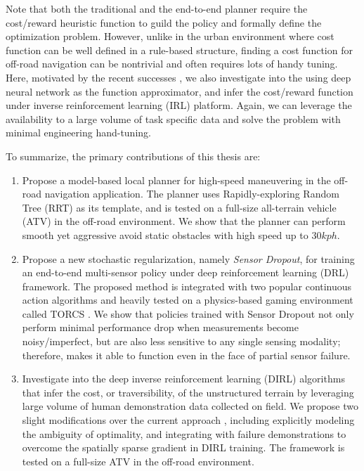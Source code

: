 \documentclass[../thesis.tex]{subfiles}
\begin{document}
Note that both the traditional and the end-to-end planner require the cost/reward heuristic function to guild the policy and formally define the optimization problem. 
However, unlike in the urban environment where cost function can be well defined in a rule-based structure, finding a cost function for off-road navigation can be nontrivial and often requires lots of handy tuning. \cite{silver2010learning}
Here, motivated by the recent successes \cite{wulfmeier2015maximum,wulfmeier2016watch}, we also investigate into the using deep neural network as the function approximator, and infer the cost/reward function under inverse reinforcement learning (IRL) platform. 
Again, we can leverage the availability to a large volume of task specific data and solve the problem with minimal engineering hand-tuning.
 
To summarize, the primary contributions of this thesis are:
\begin{enumerate}
 
    \item %
    Propose a model-based local planner for high-speed maneuvering in the off-road navigation application. 
    The planner uses Rapidly-exploring Random Tree (RRT) \cite{kuffner2000rrt} as its template, and is tested on a full-size all-terrain vehicle (ATV) in the off-road environment. 
    We show that the planner can perform smooth yet aggressive avoid static obstacles with high speed up to $30 kph$.
 
    \item %
    Propose a new stochastic regularization, namely \emph{Sensor Dropout}, for training an end-to-end multi-sensor policy under deep reinforcement learning (DRL) framework. 
    The proposed method is integrated with two popular continuous action algorithms and heavily tested on a physics-based gaming environment called TORCS \cite{wymann2000torcs}. 
    We show that policies trained with Sensor Dropout not only perform minimal performance drop when measurements become noisy/imperfect, but are also less sensitive to any single sensing modality; therefore, makes it able to function even in the face of partial sensor failure.
 
    \item %
    Investigate into the deep inverse reinforcement learning (DIRL) algorithms that infer the cost, or traversibility, of the unstructured terrain by leveraging large volume of human demonstration data collected on field. 
    We propose two slight modifications over the current approach \cite{wulfmeier2015maximum}, including explicitly modeling the ambiguity of optimality, and integrating with failure demonstrations to overcome the spatially sparse gradient in DIRL training.
    The framework is tested on a full-size ATV in the off-road environment.
 
\end{enumerate}
 
\end{document}
